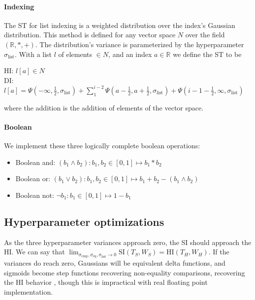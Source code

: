 \documentclass{article}
\begin{document}
\paragraph{Indexing} The ST for list indexing is a weighted distribution over the index's Gaussian distribution. This method is defined for any vector space $N$ over the field $(\mathbb{R}, *, +)$. The distribution's variance is parameterized by the hyperparameter $\sigma_{\text{list}}$. With a list $l$ of elements $\in N$, and an index $a \in \mathbb{R}$ we define the ST to be
\begin{center}
  HI: $l[a] \in N$\\
  DI: $l[a] = \Psi(-\infty, \frac{1}{2}, \sigma_{\text{list}}) + \sum_1^{i-2}\Psi(a-\frac{1}{2}, a+\frac{1}{2}, \sigma_{\text{list}}) + \Psi(i - 1 - \frac{1}{2}, \infty, \sigma_{\text{list}})$
\end{center}
where the addition is the addition of elements of the vector space.
\paragraph{Boolean} We implement these three logically complete boolean operations:
\begin{itemize}
  \item Boolean and: $(b_1 \land b_2): b_1, b_2 \in [0, 1] \mapsto b_1 * b_2$
  \item Boolean or: $(b_1 \lor b_2): b_1, b_2 \in [0, 1] \mapsto b_1 + b_2 - (b_1 \land b_2)$
  \item Boolean not: $\neg b_1: b_1 \in [0, 1] \mapsto 1 - b_1$\\
\end{itemize}

\subsection{Hyperparameter optimizations}
As the three hyperparameter variances approach zero, the SI should approach the HI. We can say that $\lim_{\sigma_{\text{cmp}}, \sigma_{\text{eq}}, \sigma_{\text{list}} \rightarrow 0} \text{SI}(T_S, W_S) = \text{HI}(T_H, W_H)$. If the variances do reach zero, Gaussians will be equivalent delta functions, and sigmoids become step functions recovering non-equality comparisons, recovering the HI behavior , though this is impractical with real floating point implementation.
\end{document}
